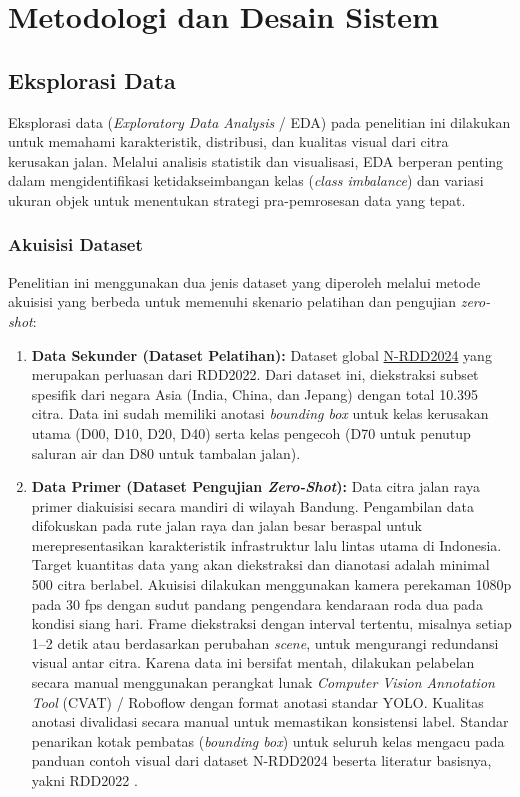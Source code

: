\chapter{Metodologi dan Desain Sistem}

\section{Eksplorasi Data}
Eksplorasi data (\textit{Exploratory Data Analysis} / EDA) pada penelitian ini dilakukan untuk memahami karakteristik, distribusi, dan kualitas visual dari citra kerusakan jalan. Melalui analisis statistik dan visualisasi, EDA berperan penting dalam mengidentifikasi ketidakseimbangan kelas (\textit{class imbalance}) dan variasi ukuran objek untuk menentukan strategi pra-pemrosesan data yang tepat.

\subsection{Akuisisi Dataset}
Penelitian ini menggunakan dua jenis dataset yang diperoleh melalui metode akuisisi yang berbeda untuk memenuhi skenario pelatihan dan pengujian \textit{zero-shot}:
\begin{enumerate}
	\item \textbf{Data Sekunder (Dataset Pelatihan):} Dataset global \textcolor{blue}{\href{https://data.mendeley.com/datasets/27c8pwsd6v/3}{N-RDD2024}} yang merupakan perluasan dari RDD2022. Dari dataset ini, diekstraksi subset spesifik dari negara Asia (India, China, dan Jepang) dengan total 10.395 citra. Data ini sudah memiliki anotasi \textit{bounding box} untuk kelas kerusakan utama (D00, D10, D20, D40) serta kelas pengecoh (D70 untuk penutup saluran air dan D80 untuk tambalan jalan).
	\item \textbf{Data Primer (Dataset Pengujian \textit{Zero-Shot}):} Data citra jalan raya primer diakuisisi secara mandiri di wilayah Bandung. Pengambilan data difokuskan pada rute jalan raya dan jalan besar beraspal untuk merepresentasikan karakteristik infrastruktur lalu lintas utama di Indonesia. Target kuantitas data yang akan diekstraksi dan dianotasi adalah minimal 500 citra berlabel. Akuisisi dilakukan menggunakan kamera perekaman 1080p pada 30 fps dengan sudut pandang pengendara kendaraan roda dua pada kondisi siang hari. Frame diekstraksi dengan interval tertentu, misalnya setiap 1–2 detik atau berdasarkan perubahan \textit{scene}, untuk mengurangi redundansi visual antar citra. Karena data ini bersifat mentah, dilakukan pelabelan secara manual menggunakan perangkat lunak \textit{Computer Vision Annotation Tool} (CVAT) / Roboflow dengan format anotasi standar YOLO. Kualitas anotasi divalidasi secara manual untuk memastikan konsistensi label. Standar penarikan kotak pembatas (\textit{bounding box}) untuk seluruh kelas mengacu pada panduan contoh visual dari dataset N-RDD2024 beserta literatur basisnya, yakni RDD2022 \cite{Arya2024846}.

\end{enumerate}

